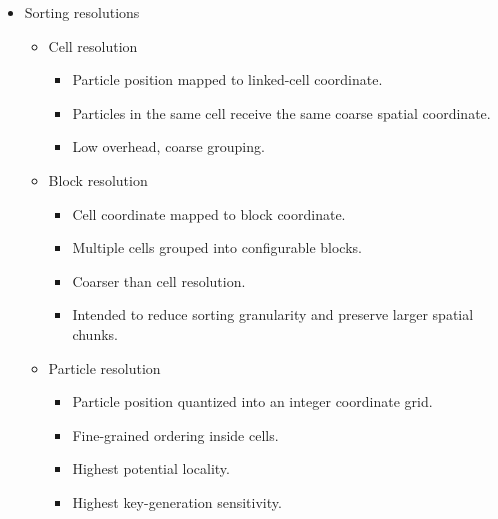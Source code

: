 \begin{itemize}
    \item Sorting resolutions
    \begin{itemize}
        \item Cell resolution
        \begin{itemize}
            \item Particle position mapped to linked-cell coordinate.
            \item Particles in the same cell receive the same coarse spatial coordinate.
            \item Low overhead, coarse grouping.
        \end{itemize}
        \item Block resolution
        \begin{itemize}
            \item Cell coordinate mapped to block coordinate.
            \item Multiple cells grouped into configurable blocks.
            \item Coarser than cell resolution.
            \item Intended to reduce sorting granularity and preserve larger spatial chunks.
        \end{itemize}
        \item Particle resolution
        \begin{itemize}
            \item Particle position quantized into an integer coordinate grid.
            \item Fine-grained ordering inside cells.
            \item Highest potential locality.
            \item Highest key-generation sensitivity.
        \end{itemize}
    \end{itemize}


\end{itemize}
